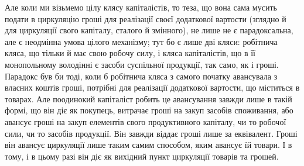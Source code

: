 Але коли ми візьмемо цілу клясу капіталістів, то теза, що вона сама
мусить подати в циркуляцію гроші для реалізації своєї додаткової вартости
(зглядно й для циркуляції свого капіталу, сталого й змінного), не
лише не є парадоксальна, але є неодмінна умова цілого механізму; тут
бо є лише дві кляси: робітнича кляса, що тільки й має свою робочу силу,
і кляса капіталістів, що в її монопольному володінні є засоби суспільної
продукції, так само, як і гроші. Парадокс був би тоді, коли б робітнича
кляса з самого початку авансувала з власних коштів гроші, потрібні для
реалізації додаткової вартости, що міститься в товарах. Але поодинокий
капіталіст робить це авансування завжди лише в такій формі, що він діє
як покупець, витрачає гроші на закуп засобів споживання, або
авансує гроші на закуп елементів свого продуктивного капіталу, чи то
робочої сили, чи то засобів продукції. Він завжди віддає гроші лише
за еквівалент. Гроші він авансує циркуляції лише таким самим способом,
яким авансує їй товари. І в тому, і в цьому разі він діє як вихідний пункт
циркуляції товарів та грошей.
